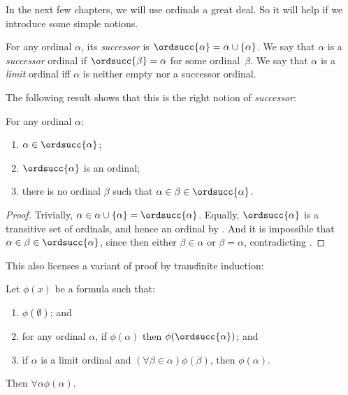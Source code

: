 \documentclass[../../../include/open-logic-section]{subfiles}
\begin{document}

In the next few chapters, we will use ordinals a great deal. So it
will help if we introduce some simple notions. 

\begin{defn}
For any ordinal $\alpha$, its \emph{successor} is $\ordsucc{\alpha}
=\alpha \cup \{\alpha\}$. We say that $\alpha$ is a \emph{successor}
ordinal if $\ordsucc{\beta} = \alpha$ for some ordinal~$\beta$. We
say that $\alpha$ is a \emph{limit} ordinal iff $\alpha$ is neither
empty nor a successor ordinal.
\end{defn}
\noindent
The following result shows that this is the right notion of
\emph{successor}:

\begin{prop}
For any ordinal $\alpha$:
\begin{enumerate}
	\item $\alpha \in \ordsucc{\alpha}$;
	\item $\ordsucc{\alpha}$ is an ordinal;
	\item there is no ordinal $\beta$ such that $\alpha \in \beta \in
	\ordsucc{\alpha}$.
	\end{enumerate}
\end{prop}

\begin{proof}
Trivially, $\alpha \in \alpha \cup \{\alpha\} = \ordsucc{\alpha}$.
Equally, $\ordsucc{\alpha}$ is a transitive set of ordinals, and hence
an ordinal by .
And it is impossible that $\alpha \in \beta \in \ordsucc{\alpha}$,
since then either $\beta \in \alpha$ or $\beta = \alpha$,
contradicting .
\end{proof}
\noindent
This also licenses a variant of proof by transfinite induction:

\begin{thm}
Let $\phi(x)$ be a formula such that:
\begin{enumerate}
	\item $\phi(\emptyset)$; and
	\item for any ordinal $\alpha$, if $\phi(\alpha)$ then
	$\phi(\ordsucc{\alpha})$; and 
	\item if $\alpha$ is a limit ordinal and $(\forall \beta \in
	\alpha)\phi(\beta)$, then $\phi(\alpha)$.
\end{enumerate}
Then $\forall \alpha \phi(\alpha)$.
\end{thm}
\end{document}
